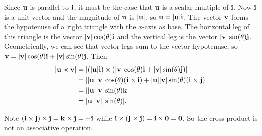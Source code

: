 \begin{activitySolution}
  \item Since $\mathbf{u}$ is parallel to $\mathbf{i}$, it must be the case that $\mathbf{u}$ is a scalar multiple of $\mathbf{i}$. Now $\mathbf{i}$ is a unit vector and the magnitude of $\mathbf{u}$ is $|\mathbf{u}|$, so $\mathbf{u} = |\mathbf{u}| \mathbf{i}$. The vector $\mathbf{v}$ forms the hypotenuse of a right triangle with the $x$-axis as base. The horizontal leg of this triangle is the vector $|\mathbf{v}| \cos(\theta) \mathbf{i}$ and the vertical leg is the vector $|\mathbf{v}|\sin(\theta) \mathbf{j}$. Geometrically, we can see that vector legs sum to the vector hypotenuse, so $\mathbf{v} = |\mathbf{v}| \cos(\theta) \mathbf{i} + |\mathbf{v}| \sin(\theta) \mathbf{j}$. Then
\begin{align*}
|\mathbf{u} \times \mathbf{v}| &= |(|\mathbf{u}| \mathbf{i}) \times (|\mathbf{v}| \cos(\theta) \mathbf{i} + |\mathbf{v}| \sin(\theta) \mathbf{j}) | \\
	&=  ||\mathbf{u}| |\mathbf{v}| \cos(\theta) (\mathbf{i} \times \mathbf{i}) + |\mathbf{u}| |\mathbf{v}| \sin(\theta) (\mathbf{i} \times \mathbf{j}) | \\
	&= ||\mathbf{u}| |\mathbf{v}| \sin(\theta) \mathbf{k} | \\
	&= |\mathbf{u}| |\mathbf{v}| |\sin(\theta) |. 
\end{align*}

  \item Note $(\mathbf{i}\times\mathbf{j})\times\mathbf{j} = \mathbf{k} \times \mathbf{j} = -\mathbf{i}$ while $\mathbf{i}\times(\mathbf{j}\times\mathbf{j}) = \mathbf{i} \times \mathbf{0} = \mathbf{0}$. So the cross product is not an associative operation. 
    \ea

\end{activitySolution}

\afterpa 